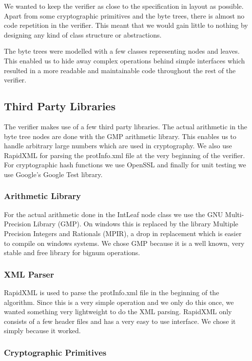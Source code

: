 We wanted to keep the verifier as close to the specification in layout as possible. Apart from some cryptographic primitives and the byte trees, there is almost no code repetition in the verifier. This meant that we would gain little to nothing by designing any kind of class structure or abstractions.

The byte trees were modelled with a few classes representing nodes and leaves. This enabled us to hide away complex operations behind simple interfaces which resulted in a more readable and maintainable code throughout the rest of the verifier.

\subsection{Third Party Libraries}

The verifier makes use of a few third party libraries. The actual arithmetic in the byte tree nodes are done with the GMP arithmetic library. This enables us to handle arbitrary large numbers which are used in cryptography. We also use RapidXML for parsing the protInfo.xml file at the very beginning of the verifier. For cryptographic hash functions we use OpenSSL and finally for unit testing we use Google's Google Test library.

\subsubsection{Arithmetic Library}

For the actual arithmetic done in the IntLeaf node class we use the GNU Multi-Precision Library (GMP). On windows this is replaced by the library Multiple Precision Integers and Rationals (MPIR), a drop in replacement which is easier to compile on windows systems. We chose GMP because it is a well known, very stable and free library for bignum operations.

\subsubsection{XML Parser}

RapidXML is used to parse the protInfo.xml file in the beginning of the algorithm. Since this is a very simple operation and we only do this once, we wanted something very lightweight to do the XML parsing. RapidXML only consists of a few header files and has a very easy to use interface. We chose it simply because it worked.

\subsubsection{Cryptographic Primitives}

